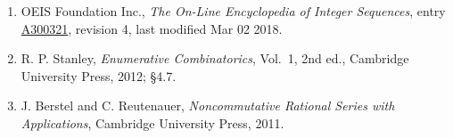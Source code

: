 \documentclass[11pt]{article}
\theoremstyle{definition}
\begin{document}
\begin{enumerate}

\item OEIS Foundation Inc., \emph{The On-Line Encyclopedia of Integer Sequences}, entry \href{https://oeis.org/A300321}{A300321}, revision 4, last modified Mar 02 2018.

\item R. P. Stanley, \emph{Enumerative Combinatorics}, Vol.~1, 2nd ed., Cambridge University Press, 2012; \S4.7.

\item J. Berstel and C. Reutenauer, \emph{Noncommutative Rational Series with Applications}, Cambridge University Press, 2011.

\end{enumerate}
\end{document}
